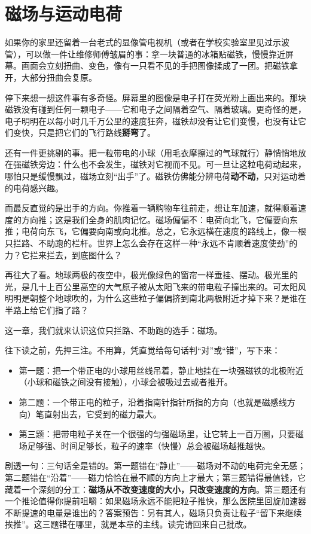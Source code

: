 \chapter{磁场与运动电荷}


\begin{mainline}
如果你的家里还留着一台老式的显像管电视机（或者在学校实验室里见过示波管），可以做一件让维修师傅皱眉的事：拿一块普通的冰箱贴磁铁，慢慢靠近屏幕。画面会立刻扭曲、变色，像有一只看不见的手把图像揉成了一团。把磁铁拿开，大部分扭曲会复原。

停下来想一想这件事有多奇怪。屏幕里的图像是电子打在荧光粉上画出来的。那块磁铁没有碰到任何一颗电子——它和电子之间隔着空气、隔着玻璃。更奇怪的是，电子明明在以每小时几千万公里的速度狂奔，磁铁却没有让它们变慢，也没有让它们变快，只是把它们的飞行路线\textbf{掰弯}了。

还有一件更挑剔的事。把一粒带电的小球（用毛衣摩擦过的气球就行）静悄悄地放在强磁铁旁边：什么也不会发生，磁铁对它视而不见。可一旦让这粒电荷动起来，哪怕只是缓慢飘过，磁场立刻“出手”了。磁铁仿佛能分辨电荷\textbf{动不动}，只对运动着的电荷感兴趣。

而最反直觉的是出手的方向。你推着一辆购物车往前走，想让车加速，就得顺着速度的方向推；这是我们全身的肌肉记忆。磁场偏偏不：电荷向北飞，它偏要向东推；电荷向东飞，它偏要向南或向北推。总之，它永远横在速度的路线上，像一根只拦路、不助跑的栏杆。世界上怎么会存在这样一种“永远不肯顺着速度使劲”的力？它拦来拦去，到底图什么？

再往大了看。地球两极的夜空中，极光像绿色的窗帘一样垂挂、摆动。极光里的光，是几十上百公里高空的大气原子被从太阳飞来的带电粒子撞出来的。可太阳风明明是朝整个地球吹的，为什么这些粒子偏偏挤到南北两极附近才掉下来？是谁在半路上给它们指了路？

这一章，我们就来认识这位只拦路、不助跑的选手：磁场。
\end{mainline}


\begin{mainline}
往下读之前，先押三注。不用算，凭直觉给每句话判“对”或“错”，写下来：

\begin{itemize}
  \item 第一题：把一个带正电的小球用丝线吊着，静止地挂在一块强磁铁的北极附近（小球和磁铁之间没有接触），小球会被吸过去或者推开。
  \item 第二题：一个带正电的粒子，沿着指南针指针所指的方向（也就是磁感线方向）笔直射出去，它受到的磁力最大。
  \item 第三题：把带电粒子关在一个很强的匀强磁场里，让它转上一百万圈，只要磁场足够强、时间足够长，粒子的速率（快慢）总会被磁场越推越快。
\end{itemize}

剧透一句：三句话全是错的。第一题错在“静止”——磁场对不动的电荷完全无感；第二题错在“沿着”——磁力恰恰在最不顺的方向上才最大；第三题错得最值钱，它藏着一个深刻的分工：\textbf{磁场从不改变速度的大小，只改变速度的方向}。第三题还有一个推论值得你提前咀嚼：如果磁场永远不能把粒子推快，那么医院里回旋加速器不断提速的电量是谁出的？答案预告：另有其人，磁场只负责让粒子“留下来继续挨推”。这三题错在哪里，就是本章的主线。读完请回来自己批改。
\end{mainline}

